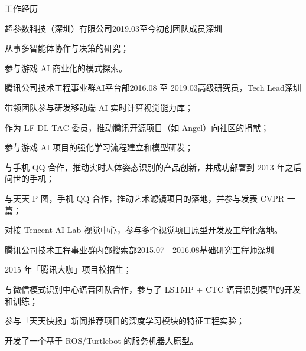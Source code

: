 \documentclass[UTF8]{cv_professional-cn} %
\begin{document}
\begin{rSection}{工作经历}

  \begin{rSubsection}{超参数科技（深圳）有限公司}{2019.03至今}{初创团队成员}{深圳}
    \item 从事多智能体协作与决策的研究；
    \item 参与游戏 AI 商业化的模式探索。
  \end{rSubsection}

  \begin{rSubsection}{腾讯公司技术工程事业群AI平台部}{2016.08 至 2019.03}{高级研究员，Tech Lead}{深圳}
    \item 带领团队参与研发移动端 AI 实时计算视觉能力库；
    \item 作为 LF DL TAC 委员，推动腾讯开源项目（如 Angel）向社区的捐献；
    \item 参与游戏 AI 项目的强化学习流程建立和模型研发；
    \item 与手机 QQ 合作，推动实时人体姿态识别的产品创新，并成功部署到 2013 年之后问世的手机；
    \item 与天天 P 图，手机 QQ 合作，推动艺术滤镜项目的落地，并参与发表 CVPR 一篇；
    \item 对接 Tencent AI Lab 视觉中心，参与多个视觉项目原型开发及工程化落地。
  \end{rSubsection}

	\begin{rSubsection}{腾讯公司技术工程事业群内部搜索部}{2015.07 - 2016.08}{基础研究工程师}{深圳}
		\item 2015 年「腾讯大咖」项目校招生；
		\item 与微信模式识别中心语音团队合作，参与了 LSTMP + CTC 语音识别模型的开发和训练；
		\item 参与「天天快报」新闻推荐项目的深度学习模块的特征工程实验；
		\item 开发了一个基于 ROS/Turtlebot 的服务机器人原型。
	\end{rSubsection}

\end{rSection}


\end{document}
